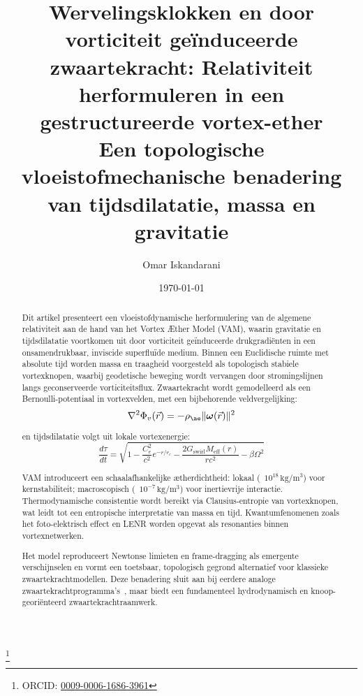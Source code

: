 \documentclass[a4paper, aps,preprint,superscriptaddress, 12pt]{revtex4}
\begin{document}
\author{Omar Iskandarani}
\title{
    Wervelingsklokken en door vorticiteit geïnduceerde zwaartekracht:
    Relativiteit herformuleren in een gestructureerde vortex-ether\\
    \textnormal{\normalsize Een topologische vloeistofmechanische benadering van tijdsdilatatie, massa en gravitatie}
}

\date{\today}
\thanks{ORCID: \href{https://orcid.org/0009-0006-1686-3961}{0009-0006-1686-3961}}



\begin{abstract}
Dit artikel presenteert een vloeistofdynamische herformulering van de algemene relativiteit aan de hand van het Vortex Æther Model (VAM), waarin gravitatie en tijdsdilatatie voortkomen uit door vorticiteit geïnduceerde drukgradiënten in een onsamendrukbaar, inviscide superfluïde medium. Binnen een Euclidische ruimte met absolute tijd worden massa en traagheid voorgesteld als topologisch stabiele vortexknopen, waarbij geodetische beweging wordt vervangen door stromingslijnen langs geconserveerde vorticiteitsflux.
Zwaartekracht wordt gemodelleerd als een Bernoulli-potentiaal in vortexvelden, met een bijbehorende veldvergelijking:
\begin{equation*}
    \nabla^2 \Phi_v(\vec{r}) = -\rho_{\ae} \|\boldsymbol{\omega}(\vec{r})\|^2
\end{equation*}

en tijdsdilatatie volgt uit lokale vortexenergie:
\begin{equation*}
    \frac{d\tau}{dt} = \sqrt{1 - \frac{C_e^2}{c^2} e^{-r/r_c} - \frac{2G_{\text{swirl}} M_{\text{eff}}(r)}{rc^2} - \beta \Omega^2}
\end{equation*}

VAM introduceert een schaalafhankelijke ætherdichtheid: lokaal (~$10^{18}\,\mathrm{kg/m^3}$) voor kernstabiliteit; macroscopisch (~$10^{-7}\,\mathrm{kg/m^3}$) voor inertievrije interactie. Thermodynamische consistentie wordt bereikt via Clausius-entropie van vortexknopen, wat leidt tot een entropische interpretatie van massa en tijd. Kwantumfenomenen zoals het foto-elektrisch effect en LENR worden opgevat als resonanties binnen vortexnetwerken.

Het model reproduceert Newtonse limieten en frame-dragging als emergente verschijnselen en vormt een toetsbaar, topologisch gegrond alternatief voor klassieke zwaartekrachtmodellen. Deze benadering sluit aan bij eerdere analoge zwaartekrachtprogramma’s~\cite{barcelo2011analogue,volovik2009universe}, maar biedt een fundamenteel hydrodynamisch en knoop-georiënteerd zwaartekrachtraamwerk.
\end{abstract}
\end{document}

